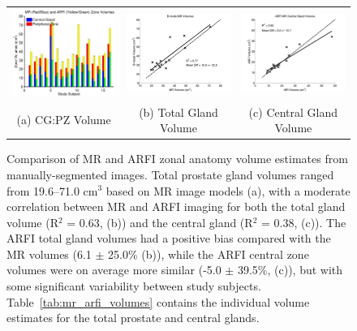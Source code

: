\begin{figure}[htb!]
\centering
\begin{tabular}{ccc}
\includegraphics[width=0.3\linewidth]{figs/mr_arfi_volumes} &
\includegraphics[width=0.3\linewidth]{figs/mr_arfi_total_linreg} &
\includegraphics[width=0.3\linewidth]{figs/mr_arfi_central_linreg} \\
(a) CG:PZ Volume & (b) Total Gland Volume & (c) Central Gland Volume \\
\end{tabular}
\caption{Comparison of MR and ARFI zonal anatomy volume estimates from
    manually-segmented images.  Total prostate gland volumes ranged from
    19.6--71.0 cm$^3$ based on MR image models (a), with a moderate correlation
    between MR and ARFI imaging for both the total gland volume (R$^2$ = 0.63,
    (b)) and the central gland (R$^2$ = 0.38, (c)).  The ARFI total gland
    volumes had a positive bias compared with the MR volumes (6.1 $\pm$ 25.0\%
    (b)), while the ARFI central zone volumes were on average more similar
    (-5.0 $\pm$ 39.5\%, (c)), but with some significant variability between
    study subjects.  Table~\ref{tab:mr_arfi_volumes} contains the individual
    volume estimates for the total prostate and central glands.}
\label{fig:mr_arfi_volumes} 
\end{figure}

